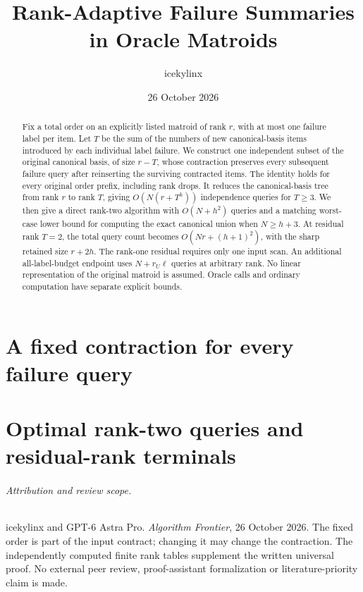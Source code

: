 
\providecommand{\tightlist}{\setlength{\itemsep}{0pt}\setlength{\parskip}{0pt}}
\title{Rank-Adaptive Failure Summaries\\in Oracle Matroids}
\author{icekylinx}
\date{26 October 2026}

\maketitle
\begin{abstract}
Fix a total order on an explicitly listed matroid of rank \(r\), with at
most one failure label per item. Let \(T\) be the sum of the numbers of
new canonical-basis items introduced by each individual label failure.
We construct one independent subset of the original canonical basis,
of size \(r-T\), whose contraction preserves every subsequent failure
query after reinserting the surviving contracted items. The identity holds
for every original order prefix, including rank drops. It reduces the
canonical-basis tree from rank \(r\) to rank \(T\), giving
\(O(N(r+T^h))\) independence queries for \(T\ge3\). We then give a
direct rank-two algorithm with \(O(N+h^2)\) queries and a matching
worst-case lower bound for computing the exact canonical union when
\(N\ge h+3\). At residual rank \(T=2\), the total query count becomes
\(O(Nr+(h+1)^2)\), with the sharp retained size \(r+2h\).
The rank-one residual requires only one input scan. An additional
all-label-budget endpoint uses \(N+r_U\ell\) queries at arbitrary rank.
No linear representation of the original matroid is assumed. Oracle calls
and ordinary computation have separate explicit bounds.
\end{abstract}
\setcounter{secnumdepth}{0}
\part{A fixed contraction for every failure query}

\part{Optimal rank-two queries and residual-rank terminals}

\paragraph{Attribution and review scope.}
icekylinx and GPT-6 Astra Pro. \emph{Algorithm Frontier}, 26 October 2026.
The fixed order is part of the input contract; changing it may change the
contraction. The independently computed finite rank tables supplement the
written universal proof. No external peer review, proof-assistant
formalization or literature-priority claim is made.

